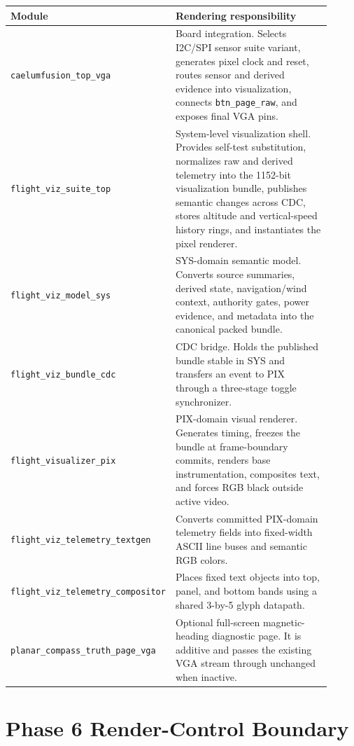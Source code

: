 \documentclass{article}
\newcommand{\sig}[1]{\begingroup\nolinkurl{#1}\endgroup}
\newcommand{\file}[1]{\begingroup\nolinkurl{#1}\endgroup}
\begin{document}
\begin{longtable}{p{0.28\linewidth} p{0.63\linewidth}}
\toprule
\textbf{Module} & \textbf{Rendering responsibility} \\
\midrule
\endhead
\file{caelumfusion_top_vga} &
Board integration.  Selects I2C/SPI sensor suite variant, generates pixel clock
and reset, routes sensor and derived evidence into visualization, connects
\sig{btn_page_raw}, and exposes final VGA pins. \\

\file{flight_viz_suite_top} &
System-level visualization shell.  Provides self-test substitution, normalizes
raw and derived telemetry into the 1152-bit visualization bundle, publishes
semantic changes across CDC, stores altitude and vertical-speed history rings,
and instantiates the pixel renderer. \\

\file{flight_viz_model_sys} &
SYS-domain semantic model.  Converts source summaries, derived state,
navigation/wind context, authority gates, power evidence, and metadata into the
canonical packed bundle. \\

\file{flight_viz_bundle_cdc} &
CDC bridge.  Holds the published bundle stable in SYS and transfers an event to
PIX through a three-stage toggle synchronizer. \\

\file{flight_visualizer_pix} &
PIX-domain visual renderer.  Generates timing, freezes the bundle at
frame-boundary commits, renders base instrumentation, composites text, and
forces RGB black outside active video. \\

\file{flight_viz_telemetry_textgen} &
Converts committed PIX-domain telemetry fields into fixed-width ASCII line buses
and semantic RGB colors. \\

\file{flight_viz_telemetry_compositor} &
Places fixed text objects into top, panel, and bottom bands using a shared
3-by-5 glyph datapath. \\

\file{planar_compass_truth_page_vga} &
Optional full-screen magnetic-heading diagnostic page.  It is additive and
passes the existing VGA stream through unchanged when inactive. \\
\bottomrule
\end{longtable}

\section{Phase 6 Render-Control Boundary}
\end{document}
